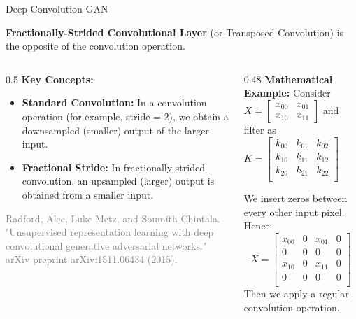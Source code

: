 \documentclass[aspectratio=169,xcolor=dvipsnames,svgnames,x11names,fleqn]{beamer}
\begin{document}
\begin{frame}{Deep Convolution GAN}
\scriptsize

\begin{tcolorbox}[colback=mainblue!5, colframe=mainblue, arc=3pt, boxrule=0.5pt]
    \textbf{Fractionally-Strided Convolutional Layer} (or Transposed Convolution) is the opposite of the convolution operation.
\end{tcolorbox}

\begin{columns}[t]
    \begin{column}{0.5\textwidth}
        \textbf{Key Concepts:}
        \begin{itemize}
            \item \textbf{Standard Convolution:} In a convolution operation (for example, stride = 2), we obtain a downsampled (smaller) output of the larger input.
            \item \textbf{Fractional Stride:} In fractionally-strided convolution, an upsampled (larger) output is obtained from a smaller input.
        \end{itemize}
        
         
        \begin{tcolorbox}[colback=gray!10, boxrule=0pt, frame hidden, left=2pt, right=2pt, top=2pt, bottom=2pt]
    \tiny \textcolor{gray}{Radford, Alec, Luke Metz, and Soumith Chintala. "Unsupervised representation learning with deep convolutional generative adversarial networks." arXiv preprint arXiv:1511.06434 (2015).}
\end{tcolorbox}

        
      

    \end{column}
    
    \begin{column}{0.48\textwidth}
        \textbf{Mathematical Example:}
        Consider $X = \begin{bmatrix}
        x_{00} & x_{01}\\
        x_{10} & x_{11}
        \end{bmatrix}$ and filter as $K = \begin{bmatrix}
        k_{00} & k_{01} & k_{02}\\
        k_{10} & k_{11} & k_{12}\\
        k_{20} & k_{21} & k_{22}\\
        \end{bmatrix}$ 
       
  \begin{tcolorbox}[colback=lightbg, colframe=gray!50,  fonttitle=\bfseries]
    We insert zeros between every other input pixel. Hence:
    \[
    X = \begin{bmatrix}
    x_{00} & 0 & x_{01} & 0\\
    0 & 0 & 0 & 0\\
    x_{10} & 0 & x_{11} & 0\\
    0 & 0 & 0 & 0\\
    \end{bmatrix}
    \]
    Then we apply a regular convolution operation.
\end{tcolorbox}


\end{column}
\end{columns}
\end{frame}
\end{document}
